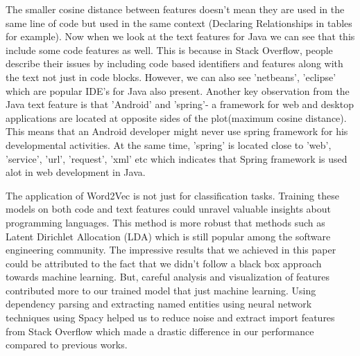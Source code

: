 \documentclass[letterpaper, 10 pt, conference]{ieeeconf}  %
\begin{document}
The smaller cosine distance between features doesn't mean they are used in the same line of code but used in the same context (Declaring Relationships in tables for example). Now when we look at the text features for Java we can see that this include some code features as well. This is because in Stack Overflow, people describe their issues by including code based identifiers and features along with the text not just in code blocks. However, we can also see 'netbeans', 'eclipse' which are popular IDE's for Java also present. Another key observation from the Java text feature is that 'Android' and 'spring'- a  framework for web and desktop applications are located at opposite sides of the plot(maximum cosine distance). This means that an Android developer might never use spring framework for his developmental activities. At the same time, 'spring' is located close to 'web', 'service', 'url', 'request', 'xml' etc which indicates that Spring framework is used alot in web development in Java.

The application of Word2Vec is not just for classification tasks. Training these models on both code and text features could unravel valuable insights about programming languages. This method is more robust that methods such as Latent Dirichlet Allocation (LDA) which is still popular among the software engineering community. The impressive results that we achieved in this paper could be attributed to the fact that we didn't follow a black box approach towards machine learning. But, careful analysis and visualization of features contributed more to our trained model that just machine learning. Using dependency parsing and extracting named entities using neural network techniques using Spacy helped us to reduce noise and extract import features from Stack Overflow which made a drastic difference in our performance compared to previous works. 
\end{document}
